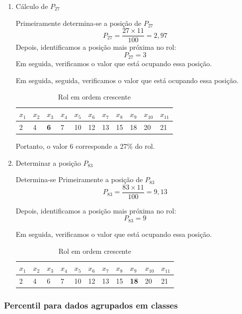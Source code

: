 \begin{enumerate} [label=\alph*.]
    \item Cálculo de \(P_{27}\)

    Primeiramente determina-se a posição de \(P_27\)
    \[
        P_27=\frac{27\times 11}{100}=2,97
    \]
    Depois, identificamos a posição mais próxima no rol:
    \[
        P_{27}=3
    \]
    Em seguida, verificamos o valor que está ocupando essa posição.

    Em seguida, seguida, verificamos o valor que está ocupando essa posição.

        \begin{table}[H]
        \centering
        \begin{tabular}{lllllllllll}
            \toprule
            $x_1$&$x_2$&$x_3$&$x_4$&$x_5$&$x_6$&$x_7$&$x_8$&$x_9$&$x_{10}$&$x_{11}$\\
            \midrule
            2& 4& \textbf{6}& 7& 10& 12& 13& 15& 18& 20& 21\\
            \bottomrule
            \end{tabular}
            \caption{Rol em ordem crescente}
    \end{table}
    Portanto, o valor 6 corresponde a 27\% do rol.

    \item Determinar a posição \(P_{83}\)
    
    Determina-se Primeiramente a posição de \(P_83\)
    \[
        P_83=\frac{83\times 11}{100}=9,13
    \]

    Depois, identificamos a posição mais próxima no rol:
    \[
        P_{83}=9
    \]

    Em seguida, verificamos o valor que está ocupando essa posição.

            \begin{table}[H]
        \centering
        \begin{tabular}{lllllllllll}
            \toprule
            $x_1$&$x_2$&$x_3$&$x_4$&$x_5$&$x_6$&$x_7$&$x_8$&$x_9$&$x_{10}$&$x_11$\\
            \midrule
            2& 4& 6& 7& 10& 12& 13& 15& \textbf{18}& 20& 21\\
            \bottomrule
            \end{tabular}
            \caption{Rol em ordem crescente}
    \end{table}
\end{enumerate}

\subsubsection{Percentil para dados agrupados em classes}

